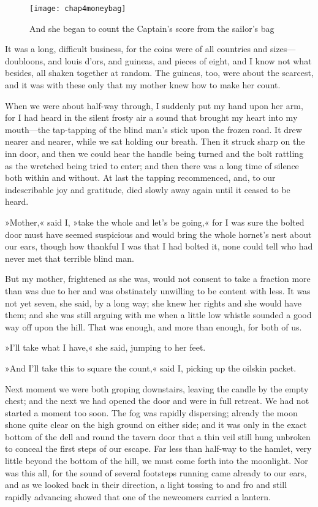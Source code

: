 \begin{figure}[p]
\centering
\texttt{[image: chap4moneybag]}
\caption[She began to count the Captain's score]{And she began to count the Captain's score from the sailor's bag}
\end{figure}

It was a long, difficult business, for the coins were of all countries and sizes—doubloons, and louis d'ors, and guineas, and pieces of eight, and I know not what besides, all shaken together at random. The guineas, too, were about the scarcest, and it was with these only that my mother knew how to make her count.

When we were about half-way through, I suddenly put my hand upon her arm, for I had heard in the silent frosty air a sound that brought my heart into my mouth—the tap-tapping of the blind man's stick upon the frozen road. It drew nearer and nearer, while we sat holding our breath. Then it struck sharp on the inn door, and then we could hear the handle being turned and the bolt rattling as the wretched being tried to enter; and then there was a long time of silence both within and without. At last the tapping recommenced, and, to our indescribable joy and gratitude, died slowly away again until it ceased to be heard.

»Mother,« said I, »take the whole and let's be going,« for I was sure the bolted door must have seemed suspicious and would bring the whole hornet's nest about our ears, though how thankful I was that I had bolted it, none could tell who had never met that terrible blind man.

But my mother, frightened as she was, would not consent to take a fraction more than was due to her and was obstinately unwilling to be content with less. It was not yet seven, she said, by a long way; she knew her rights and she would have them; and she was still arguing with me when a little low whistle sounded a good way off upon the hill. That was enough, and more than enough, for both of us.

»I'll take what I have,« she said, jumping to her feet.

»And I'll take this to square the count,« said I, picking up the oilskin packet.

Next moment we were both groping downstairs, leaving the candle by the empty chest; and the next we had opened the door and were in full retreat. We had not started a moment too soon. The fog was rapidly dispersing; already the moon shone quite clear on the high ground on either side; and it was only in the exact bottom of the dell and round the tavern door that a thin veil still hung unbroken to conceal the first steps of our escape. Far less than half-way to the hamlet, very little beyond the bottom of the hill, we must come forth into the moonlight. Nor was this all, for the sound of several footsteps running came already to our ears, and as we looked back in their direction, a light tossing to and fro and still rapidly advancing showed that one of the newcomers carried a lantern.

